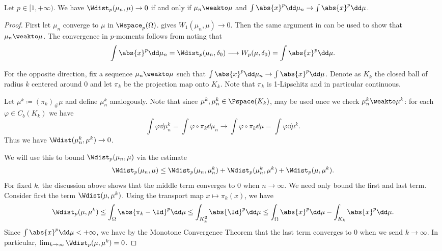 \documentclass[oneside,reqno,letterpaper]{amsart}
\begin{document}
\begin{theorem}
  Let \(p \in [1, +\infty)\).
  We have \(\Wdist_p(\mu_n, \mu) \to 0\) if and only if \(\mu_n \weakto \mu\) and \(\int \abs{x}^p \dd \mu_n \to \int \abs{x}^p \dd \mu\).
\end{theorem}
\begin{proof}
  First let \(\mu_n\) converge to \(\mu\) in \(\Wspace_p(\Omega)\).
   gives \(W_1(\mu_n, \mu) \to 0\).
  Then the same argument in  can be used to show that \(\mu_n \weakto \mu\).
  The convergence in \(p\)-moments follows from noting that
  \[
    \int \abs{x}^p \dd \mu_n
    = \Wdist_p(\mu_n, \delta_0)
    \longrightarrow W_p(\mu, \delta_0)
    = \int \abs{x}^p \dd \mu.
  \]

  For the opposite direction, fix a sequence \(\mu_n \weakto \mu\) such that \(\int \abs{x}^p \dd \mu_n \to \int \abs{x}^p \dd \mu\).
  Denote as \(K_k\) the closed ball of radius \(k\) centered around \(0\) and let \(\pi_k\) be the projection map onto \(K_k\).
  Note that \(\pi_k\) is 1-Lipschitz and in particular continuous.

  Let \(\mu^k \coloneqq (\pi_k)_{\#} \mu\) and define \(\mu_n^k\) analogously.
  Note that since \(\mu^k, \mu_n^k \in \Pspace(K_k)\),  may be used once we check \(\mu_n^k \weakto \mu^k\): for each \(\varphi \in C_b(K_k)\) we have
  \[
    \int \varphi \dd \mu_n^k
    = \int \varphi \circ \pi_k \dd \mu_n
    \longrightarrow \int \varphi \circ \pi_k \dd \mu
    = \int \varphi \dd \mu^k.
  \]
  Thus we have \(\Wdist(\mu_n^k, \mu^k) \to 0\).

  We will use this to bound \(\Wdist_p(\mu_n, \mu)\) via the estimate
  \[
    \Wdist_p(\mu_n, \mu)
    \leq \Wdist_p(\mu_n, \mu_n^k)
    + \Wdist_p(\mu_n^k, \mu^k)
    + \Wdist_p(\mu, \mu^k).
  \]
  For fixed \(k\), the discussion above shows that the middle term converges to \(0\) when \(n \to \infty\).
  We need only bound the first and last term.
  Consider first the term \(\Wdist(\mu, \mu^k)\).
  Using the transport map \(x \mapsto \pi_k(x)\), we have
  \[
    \Wdist_p(\mu, \mu^k)
    \leq \int_{\Omega} \abs{\pi_k - \Id}^p \dd \mu
    \leq \int_{K_k^\complement} \abs{\Id}^p \dd \mu
    \leq \int_{\Omega} \abs{x}^p \dd \mu - \int_{K_k} \abs{x}^p \dd \mu.
  \]
  Since \(\int \abs{x}^p \dd \mu < +\infty\), we have by the Monotone Convergence Theorem that the last term converges to \(0\) when we send \(k \to \infty\).
  In particular, \(\lim_{k \to \infty} \Wdist_p(\mu, \mu^k) = 0\).


\end{proof}
\end{document}
